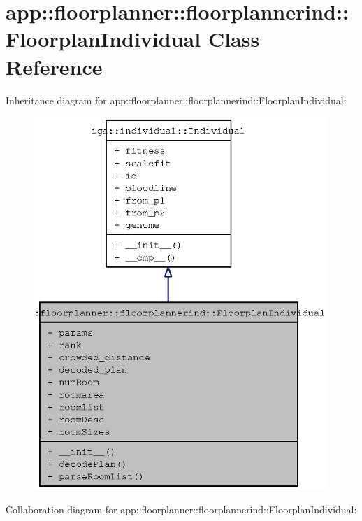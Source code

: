\section{app::floorplanner::floorplannerind::FloorplanIndividual Class Reference}
\label{classapp_1_1floorplanner_1_1floorplannerind_1_1FloorplanIndividual}
Inheritance diagram for app::floorplanner::floorplannerind::FloorplanIndividual:\nopagebreak
\begin{figure}[H]
\begin{center}
\leavevmode
\includegraphics[height=400pt]{classapp_1_1floorplanner_1_1floorplannerind_1_1FloorplanIndividual__inherit__graph}
\end{center}
\end{figure}
Collaboration diagram for app::floorplanner::floorplannerind::FloorplanIndividual:\nopagebreak
